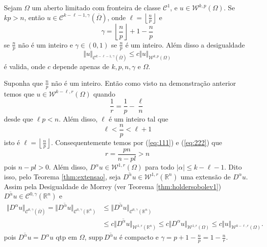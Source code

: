 \documentclass[a4paper, 11pt]{book}
\theoremstyle{definition}
\newcommand{\bR}{\mathbb{R}}
\newcommand{\cC}{\mathcal{C}}
\newcommand{\cW}{\mathcal{W}}
\newcommand{\supp}{\mathrm{supp}\,}
\begin{document}
\begin{tbox}
    Sejam $\Omega$ um aberto limitado com fronteira de classe $\cC^1$, e $u \in \cW^{k,p}(\Omega)$. 
    Se $kp > n$, então $u \in \cC^{k - \ell - 1,\gamma}(\overline\Omega)$, onde $\ell = \left\lfloor \frac{n}{p} \right\rfloor$ e
    \[
        \gamma = \left\lfloor \frac{n}{p} \right\rfloor + 1 - \frac{n}{p}
    \]
    se $\frac{n}{p}$ não é um inteiro e $\gamma \in (0,1)$ se $\frac{n}{p}$ é um inteiro.
    Além disso a desigualdade
    \[
        \Vert u \Vert_{\cC^{k - \ell - 1,\gamma}(\overline\Omega)} \leqslant c \Vert u \Vert_{\cW^{k,p}(\Omega)}
    \]
    é valida, onde $c$ depende apenas de $k, p, n, \gamma$ e $\Omega$.
\end{tbox}
\begin{prf}
    Suponha que $\frac{n}{p}$ não é um inteiro. Então como visto na demonstração anterior temos que $u \in \cW^{k-\ell,r}(\Omega)$ quando
    \begin{equation} \label{eq:111}
        \frac{1}{r} = \frac{1}{p} - \frac{\ell}{n}
    \end{equation}
    desde que $\ell p < n$. Além disso, $\ell$ é um inteiro tal que
    \begin{equation} \label{eq:222}
        \ell < \frac{n}{p} < \ell + 1
    \end{equation}
    isto é $\ell = \left\lfloor \frac{n}{p} \right\rfloor$.
    Consequentemente temos por (\ref{eq:111}) e (\ref{eq:222}) que
    \[
        r = \frac{pn}{n-pl} > n
    \]
    pois $n - pl > 0$. Além disso, $D^\alpha u \in \cW^{1,r}(\Omega)$ para todo $|\alpha| \leqslant k - \ell -1$. Dito isso, pelo Teorema \ref{thm:extensao}, seja $\overline{D^\alpha u} \in \cW^{1,r}(\bR^n)$ uma extensão de $D^\alpha u$.
    Assim pela Desigualdade de Morrey (ver Teorema \ref{thm:holdersobolev1}) $\overline{D^\alpha u} \in \cC^{0,\gamma}(\bR^n)$ e
    \[
        \begin{aligned}
            \Vert D^\alpha u \Vert_{\cC^{0,\gamma}(\overline\Omega)} = \Vert \overline{D^\alpha u} \Vert_{\cC^{0,\gamma}(\bR^n)} &\leqslant \Vert \overline{D^\alpha u} \Vert_{\cC^{0,\gamma}(\bR^n)} \\
            &\leqslant c \Vert \overline{D^\alpha u} \Vert_{\cW^{1,r}(\bR^n)}\leqslant c \Vert D^\alpha u \Vert_{\cW^{1,r}(\Omega)} \leqslant c \Vert u \Vert_{\cW^{k-\ell,r}(\Omega)}.
        \end{aligned}
    \]
    pois $\overline{D^\alpha u} = D^\alpha u$ qtp em $\Omega$, $\supp \overline{D^\alpha u}$ é compacto e $\gamma = p + 1 - \frac{n}{p} = 1 - \frac{n}{r}$.

\end{prf}
\end{document}
